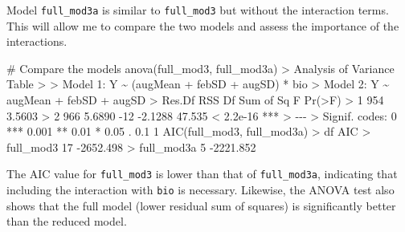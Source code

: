 \documentclass[
  letterpaper,
]{book}
\newenvironment{Shaded}{\begin{snugshade}}{\end{snugshade}}
\newcommand{\CommentTok}[1]{\textcolor[rgb]{0.37,0.37,0.37}{#1}}
\newcommand{\DecValTok}[1]{\textcolor[rgb]{0.68,0.00,0.00}{#1}}
\newcommand{\ErrorTok}[1]{\textcolor[rgb]{0.68,0.00,0.00}{#1}}
\newcommand{\FloatTok}[1]{\textcolor[rgb]{0.68,0.00,0.00}{#1}}
\newcommand{\FunctionTok}[1]{\textcolor[rgb]{0.28,0.35,0.67}{#1}}
\newcommand{\NormalTok}[1]{\textcolor[rgb]{0.00,0.23,0.31}{#1}}
\newcommand{\SpecialCharTok}[1]{\textcolor[rgb]{0.37,0.37,0.37}{#1}}
\newcommand{\StringTok}[1]{\textcolor[rgb]{0.13,0.47,0.30}{#1}}
\begin{document}
Model \texttt{full\_mod3a} is similar to \texttt{full\_mod3} but without
the interaction terms. This will allow me to compare the two models and
assess the importance of the interactions.

\begin{Shaded}
\begin{Highlighting}[]
\CommentTok{\# Compare the models}
\FunctionTok{anova}\NormalTok{(full\_mod3, full\_mod3a)}
\SpecialCharTok{\textgreater{}}\NormalTok{ Analysis of Variance Table}
\SpecialCharTok{\textgreater{}} 
\ErrorTok{\textgreater{}}\NormalTok{ Model }\DecValTok{1}\SpecialCharTok{:}\NormalTok{ Y }\SpecialCharTok{\textasciitilde{}}\NormalTok{ (augMean }\SpecialCharTok{+}\NormalTok{ febSD }\SpecialCharTok{+}\NormalTok{ augSD) }\SpecialCharTok{*}\NormalTok{ bio}
\SpecialCharTok{\textgreater{}}\NormalTok{ Model }\DecValTok{2}\SpecialCharTok{:}\NormalTok{ Y }\SpecialCharTok{\textasciitilde{}}\NormalTok{ augMean }\SpecialCharTok{+}\NormalTok{ febSD }\SpecialCharTok{+}\NormalTok{ augSD}
\SpecialCharTok{\textgreater{}}\NormalTok{   Res.Df    RSS  Df Sum of Sq      F    }\FunctionTok{Pr}\NormalTok{(}\SpecialCharTok{\textgreater{}}\NormalTok{F)    }
\SpecialCharTok{\textgreater{}} \DecValTok{1}    \DecValTok{954} \FloatTok{3.5603}                                   
\SpecialCharTok{\textgreater{}} \DecValTok{2}    \DecValTok{966} \FloatTok{5.6890} \SpecialCharTok{{-}}\DecValTok{12}   \SpecialCharTok{{-}}\FloatTok{2.1288} \FloatTok{47.535} \SpecialCharTok{\textless{}} \FloatTok{2.2e{-}16} \SpecialCharTok{**}\ErrorTok{*}
\ErrorTok{\textgreater{}} \SpecialCharTok{{-}{-}{-}}
\ErrorTok{\textgreater{}}\NormalTok{ Signif. codes}\SpecialCharTok{:}  \DecValTok{0} \StringTok{\textquotesingle{}***\textquotesingle{}} \FloatTok{0.001} \StringTok{\textquotesingle{}**\textquotesingle{}} \FloatTok{0.01} \StringTok{\textquotesingle{}*\textquotesingle{}} \FloatTok{0.05} \StringTok{\textquotesingle{}.\textquotesingle{}} \FloatTok{0.1} \StringTok{\textquotesingle{} \textquotesingle{}} \DecValTok{1}
\FunctionTok{AIC}\NormalTok{(full\_mod3, full\_mod3a)}
\SpecialCharTok{\textgreater{}}\NormalTok{            df       AIC}
\SpecialCharTok{\textgreater{}}\NormalTok{ full\_mod3  }\DecValTok{17} \SpecialCharTok{{-}}\FloatTok{2652.498}
\SpecialCharTok{\textgreater{}}\NormalTok{ full\_mod3a  }\DecValTok{5} \SpecialCharTok{{-}}\FloatTok{2221.852}
\end{Highlighting}
\end{Shaded}

The AIC value for \texttt{full\_mod3} is lower than that of
\texttt{full\_mod3a}, indicating that including the interaction with
\texttt{bio} is necessary. Likewise, the ANOVA test also shows that the
full model (lower residual sum of squares) is significantly better than
the reduced model.
\end{document}
